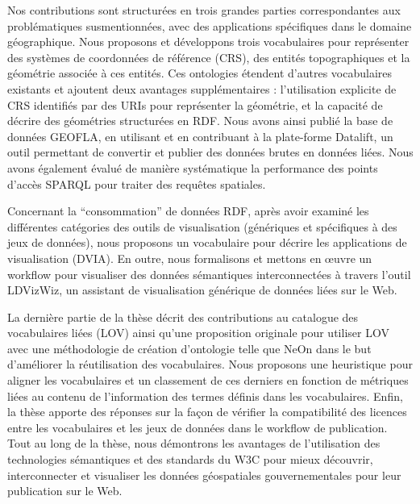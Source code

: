 Nos contributions sont structur\'{e}es en trois grandes parties correspondantes aux probl\'{e}matiques susmentionn\'{e}es, avec des applications sp\'{e}cifiques dans le domaine g\'{e}ographique. Nous proposons et d\'{e}veloppons trois vocabulaires pour repr\'{e}senter des syst\`{e}mes de coordonn\'{e}es de r\'{e}f\'{e}rence (CRS), des entit\'{e}s topographiques et la g\'{e}om\'{e}trie associ\'{e}e \`{a} ces entit\'{e}s. Ces ontologies \'{e}tendent d'autres vocabulaires existants et ajoutent deux avantages suppl\'{e}mentaires : l'utilisation explicite de CRS identifi\'{e}s par des URIs pour repr\'{e}senter la g\'{e}om\'{e}trie, et la capacit\'{e} de d\'{e}crire des g\'{e}om\'{e}tries structur\'{e}es en RDF. Nous avons ainsi publi\'{e} la base de donn\'{e}es GEOFLA, en utilisant et en contribuant \`{a} la plate-forme Datalift, un outil permettant de convertir et publier des donn\'{e}es brutes en donn\'{e}es li\'{e}es. Nous avons \'{e}galement \'{e}valu\'{e} de mani\`{e}re syst\'{e}matique la performance des points d'acc\`{e}s SPARQL pour traiter des requ\^{e}tes spatiales.

Concernant la ``consommation'' de donn\'{e}es RDF, apr\`{e}s avoir examin\'{e} les diff\'{e}rentes cat\'{e}gories des outils de visualisation (g\'{e}n\'{e}riques et sp\'{e}cifiques \`{a} des jeux de donn\'{e}es), nous proposons un vocabulaire pour d\'{e}crire les applications de visualisation (DVIA). En outre, nous formalisons et mettons en œuvre un workflow pour visualiser des donn\'{e}es s\'{e}mantiques interconnect\'{e}es \`{a} travers l'outil LDVizWiz, un assistant de visualisation g\'{e}n\'{e}rique de donn\'{e}es li\'{e}es sur le Web.

La derni\`{e}re partie de la th\`{e}se d\'{e}crit des contributions au catalogue des vocabulaires li\'{e}es (LOV) ainsi qu'une proposition originale pour utiliser LOV avec une m\'{e}thodologie de cr\'{e}ation d'ontologie telle que NeOn dans le but d'am\'{e}liorer la r\'{e}utilisation des vocabulaires. Nous proposons une heuristique pour aligner les vocabulaires et un classement de ces derniers en fonction de m\'{e}triques li\'{e}es au contenu de l'information des termes d\'{e}finis dans les vocabulaires. Enfin, la th\`{e}se apporte des r\'{e}ponses sur la fa\c{c}on de v\'{e}rifier la compatibilit\'{e} des licences entre les vocabulaires et les jeux de donn\'{e}es dans le workflow de publication. Tout au long de la th\`{e}se, nous d\'{e}montrons les avantages de l'utilisation des technologies s\'{e}mantiques et des standards du W3C pour mieux d\'{e}couvrir, interconnecter et visualiser les donn\'{e}es g\'{e}ospatiales gouvernementales pour leur publication sur le Web.

